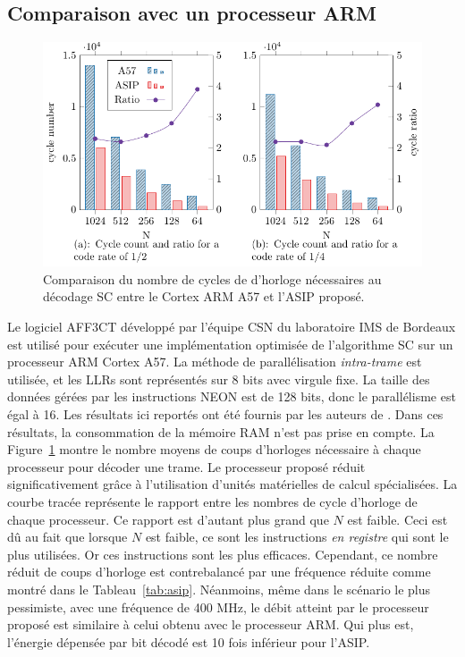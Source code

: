 \subsection{Comparaison avec un processeur ARM}

\begin{figure}
\centering
\includegraphics{main/ch3_fig/curves/cycle_count/cycle_count}
\caption{Comparaison du nombre de cycles de d'horloge nécessaires au décodage SC entre le Cortex ARM A57 et l'ASIP proposé.}
\label{fig:cycle_count}
\end{figure}

Le logiciel AFF3CT développé par l'équipe CSN du laboratoire IMS de Bordeaux est utilisé pour exécuter une implémentation optimisée de l'algorithme SC sur un processeur ARM Cortex A57. La méthode de parallélisation \textit{intra-trame} est utilisée, et les LLRs sont représentés sur 8 bits avec virgule fixe. La taille des données gérées par les instructions NEON est de 128 bits, donc le parallélisme est égal à 16. Les résultats ici reportés ont été fournis par les auteurs de \cite{cassagne_energy_2016}. Dans ces résultats, la consommation de la mémoire RAM n'est pas prise en compte.
La Figure~\ref{fig:cycle_count} montre le nombre moyens de coups d'horloges nécessaire à chaque processeur pour décoder une trame. Le processeur proposé réduit significativement grâce à l'utilisation d'unités matérielles de calcul spécialisées. La courbe tracée représente le rapport entre les nombres de cycle d'horloge de chaque processeur. Ce rapport est d'autant plus grand que $N$ est faible. Ceci est dû au fait que lorsque $N$ est faible, ce sont les instructions \textit{en registre} qui sont le plus utilisées. Or ces instructions sont les plus efficaces.
Cependant, ce nombre réduit de coups d'horloge est contrebalancé par une fréquence réduite comme montré dans le Tableau~\ref{tab:asip}. Néanmoins, même dans le scénario le plus pessimiste, avec une fréquence de 400 MHz, le débit atteint par le processeur proposé est similaire à celui obtenu avec le processeur ARM. Qui plus est, l'énergie dépensée par bit décodé est 10 fois inférieur pour l'ASIP.

